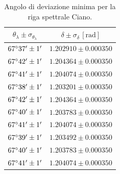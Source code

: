 \documentclass[]{article}
\begin{document}
    \begin{table}[H]
        \centering
        \begin{tabular}{||c|c||}
            \hline
            $\theta_{\lambda} \pm \sigma_{\theta_{\lambda}}$ & $\delta \pm \sigma_{\delta} \,\left[\text{rad}\right]$ \\\hline
            \hline
            $67\degree 37' \pm 1'$ & $1.202910 \pm 0.000350$ \\\hline
            $67\degree 42' \pm 1'$ & $1.204364 \pm 0.000350$ \\\hline
            $67\degree 41' \pm 1'$ & $1.204074 \pm 0.000350$ \\\hline
            $67\degree 38' \pm 1'$ & $1.203201 \pm 0.000350$ \\\hline
            $67\degree 42' \pm 1'$ & $1.204364 \pm 0.000350$ \\\hline
            $67\degree 40' \pm 1'$ & $1.203783 \pm 0.000350$ \\\hline
            $67\degree 41' \pm 1'$ & $1.204074 \pm 0.000350$ \\\hline
            $67\degree 39' \pm 1'$ & $1.203492 \pm 0.000350$ \\\hline
            $67\degree 40' \pm 1'$ & $1.203783 \pm 0.000350$ \\\hline
            $67\degree 41' \pm 1'$ & $1.204074 \pm 0.000350$ \\\hline
        \end{tabular}
        \caption{Angolo di deviazione minima per la riga spettrale Ciano.}
        \label{ciano}
    \end{table}
\end{document}
